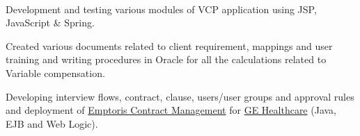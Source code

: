\documentclass[]{hieudo-build}
\begin{document}
\begin{minipage}[t]{0.65\textwidth}
 \\
\begin{tightemize}
\item Development and testing various modules of VCP application using JSP, JavaScript \& Spring.
\item Created various documents related to client requirement, mappings and user training and writing procedures in Oracle for all the calculations related to Variable compensation.
\end{tightemize}
\sectionsep

\begin{tightemize}
\item Developing interview flows, contract, clause, users/user groups and approval rules and deployment of \href{https://www-01.ibm.com/software/info/emptoris/}{Emptoris Contract Management} for \href{www.gehealthcare.com/}{GE Healthcare} (Java, EJB and Web Logic).
\end{tightemize}
\sectionsep






\end{minipage}
\end{document}
